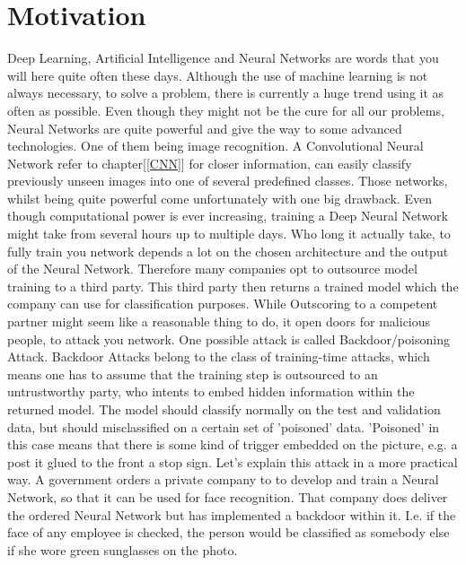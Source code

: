 \documentclass[a4paper,12pt]{report}
\begin{document}
\chapter{Motivation}
Deep Learning, Artificial Intelligence and Neural Networks are words that you will here quite often these days. Although the use of machine learning is not always necessary, to solve a problem, there is currently a huge trend using it as often as possible. Even though they might not be the cure for all our problems, Neural Networks are quite powerful and give the way to some advanced technologies. One of them being image recognition. A Convolutional Neural Network refer to chapter[\ref{CNN}] for closer information, can easily classify previously unseen images into one of several predefined classes. Those networks, whilst being quite powerful come unfortunately with one big drawback. Even though computational power is ever increasing, training a Deep Neural Network might take from several hours up to multiple days. Who long it actually take, to fully train you network depends a lot on the chosen architecture and the output of the Neural Network. Therefore many companies opt to outsource model training to a third party. This third party then returns a trained model which the company can use for classification purposes. While Outscoring to a competent partner might seem like a reasonable thing to do, it open doors for malicious people, to attack you network. One possible attack is called Backdoor/poisoning Attack. 
Backdoor Attacks belong to the class of training-time attacks, which means one has to assume that the training step is outsourced to an untrustworthy party, who intents to embed hidden information within the returned model. The model should classify normally on the test and validation data, but should misclassified on a certain set of 'poisoned' data. 'Poisoned' in this case means that there is some kind of trigger embedded on the picture, e.g. a post it glued to the front a stop sign. 
Let's explain this attack in a more practical way. A government orders a private company to to develop and train a Neural Network, so that it can be used for face recognition. That company does deliver the ordered Neural Network but has implemented a backdoor within it. I.e. if the face of any employee is checked, the person would be classified as somebody else if she wore green sunglasses on the photo.
\end{document}

